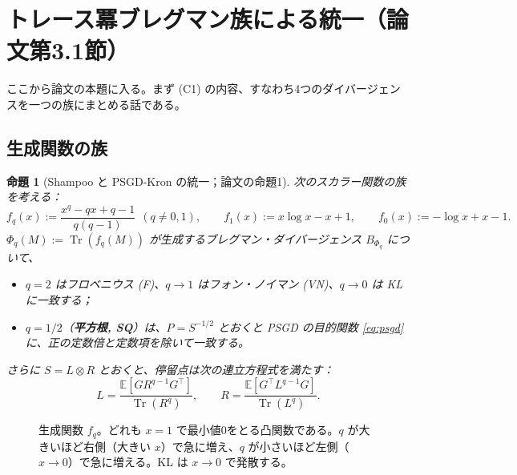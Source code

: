 \documentclass[a4paper,11pt]{ltjsarticle}
\theoremstyle{definition}
\theoremstyle{plain}
\newtheorem{proposition}[definition]{命題}
\newcommand{\E}{\mathbb{E}}
\DeclareMathOperator{\Tr}{Tr}
\newcommand{\T}{^{\top}}
\begin{document}
\section{トレース冪ブレグマン族による統一（論文第3.1節）}\label{sec:family}

ここから論文の本題に入る。まず (C1) の内容、すなわち4つのダイバージェンスを一つの族にまとめる話である。

\subsection{生成関数の族}

\begin{proposition}[Shampoo と PSGD-Kron の統一；論文の命題1]\label{prop:unify}
次のスカラー関数の族を考える：
\begin{equation}\label{eq:fq}
  f_q(x) := \frac{x^q - qx + q - 1}{q(q-1)}\ \ (q\neq0,1),\qquad
  f_1(x) := x\log x - x + 1,\qquad
  f_0(x) := -\log x + x - 1 .
\end{equation}
$\Phi_q(M) := \Tr(f_q(M))$ が生成するブレグマン・ダイバージェンス $B_{\Phi_q}$ について、
\begin{itemize}
  \item $q = 2$ はフロベニウス (F)、$q\to1$ はフォン・ノイマン (VN)、$q\to0$ は KL に一致する；
  \item $q = 1/2$（\textbf{平方根, SQ}）は、$P = S^{-1/2}$ とおくと PSGD の目的関数 \eqref{eq:psgd} に、正の定数倍と定数項を除いて一致する。
\end{itemize}
さらに $S = L\otimes R$ とおくと、停留点は次の連立方程式を満たす：
\begin{equation}\label{eq:stationary}
  L = \frac{\E[G R^{q-1}G\T]}{\Tr(R^q)},\qquad R = \frac{\E[G\T L^{q-1}G]}{\Tr(L^q)} .
\end{equation}
\end{proposition}

\begin{figure}[t]
\centering
{}
\caption{生成関数 $f_q$。どれも $x=1$ で最小値0をとる凸関数である。$q$ が大きいほど右側（大きい $x$）で急に増え、$q$ が小さいほど左側（$x\to0$）で急に増える。KL は $x\to0$ で発散する。}
\label{fig:fq}
\end{figure}
\end{document}
